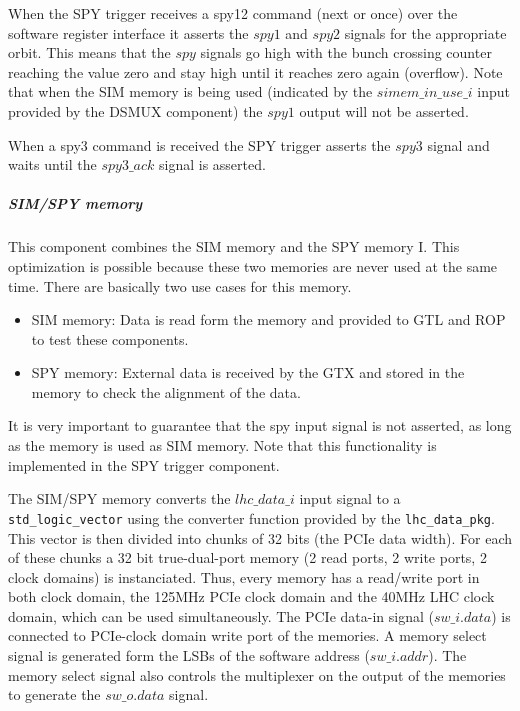 
When the SPY trigger receives a spy12 command (next or once) over the software register interface it asserts the $spy1$ and $spy2$ signals for the appropriate orbit.
This means that the $spy$ signals go high with the bunch crossing counter reaching the value zero and stay high until it reaches zero again (overflow). Note that when
the SIM memory is being used (indicated by the $simem\_in\_use\_i$ input provided by the DSMUX component) the $spy1$ output will not be asserted.

When a spy3 command is received the SPY trigger asserts the $spy3$ signal and waits until the $spy3\_ack$ signal is asserted.

\subparagraph{SIM/SPY memory}
This component combines the SIM memory and the SPY memory I. This optimization is possible because these two memories are never used at the same time. There are basically
two use cases for this memory.
\begin{itemize}
\item SIM memory: Data is read form the memory and provided to GTL and ROP to test these components.
\item SPY memory: External data is received by the GTX and stored in the memory to check the alignment of the data.
\end{itemize}
It is very important to guarantee that the spy input signal is not asserted, as long as the memory is used as SIM memory. Note that this functionality is implemented in
the SPY trigger component.

The SIM/SPY memory converts the $lhc\_data\_i$ input signal to a \texttt{std\_logic\_vector} using the converter function provided by the \texttt{lhc\_data\_pkg}. This vector
is then divided into chunks of 32 bits (the PCIe data width). For each of these chunks a 32 bit true-dual-port memory (2 read ports, 2 write ports, 2 clock domains) is instanciated.
Thus, every memory has a read/write port in both clock domain, the 125MHz PCIe clock domain and the 40MHz LHC clock domain, which can be used simultaneously.
The PCIe data-in signal ($sw\_i.data$) is connected to PCIe-clock domain write port of the memories. A memory select signal is generated form the LSBs of the software address ($sw\_i.addr$).
The memory select signal also controls the multiplexer on the output of the memories to generate the $sw\_o.data$ signal.

